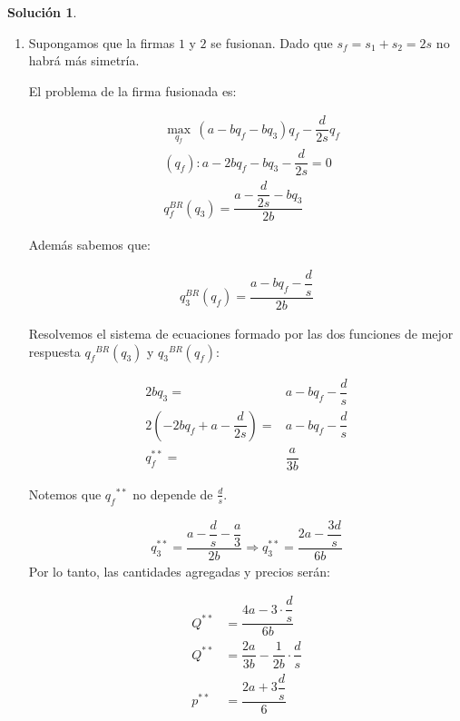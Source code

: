 \documentclass[a4paper, 11pt]{article}
\theoremstyle{definition}
\newtheorem{solucion}{Soluci\'on}
\begin{document}
\begin{solucion}
\begin{enumerate}
\begin{enumerate}
\item
Supongamos que la firmas $1$ y $2$ se fusionan. Dado que $s_f=s_1+s_2=2s$ no habrá más simetría.

El problema de la firma fusionada es:

\vspace*{-12pt}

\begin{align*}
 &\displaystyle\max_{q_f}\,(a-bq_f-bq_3)q_f-\dfrac{d}{2s}q_f \\
 &(q_f): a-2bq_f-bq_3-\dfrac{d}{2s}=0\\
& q_f^{BR}(q_3)=\dfrac{a-\dfrac{d}{2s}-bq_3}{2b}
\end{align*}

Además sabemos que:

\vspace*{-32pt}

\begin{align*}
q_3^{BR}(q_f)=\dfrac{a-bq_f-\dfrac{d}{s}}{2b}
\end{align*}

Resolvemos el sistema de ecuaciones formado por las dos funciones de mejor respuesta ${q_f}^{BR}(q_3)$ y ${q_3}^{BR}(q_f)$: 

\vspace*{-32pt}

\begin{align*}
2bq_3=&a-bq_f-\dfrac{d}{s}\\
2\left(-2bq_f+a-\dfrac{d}{2s}\right)=&a-bq_f-\dfrac{d}{s}\\
q_f^{**}=&\dfrac{a}{3b}
\end{align*}

Notemos que ${q_f}^{**}$ no depende de $\frac{d}{s}$.

\vspace*{-32pt}
\begin{align*}
q_3^{**}=\dfrac{a-\dfrac{d}{s}-\dfrac{a}{3}}{2b}\Rightarrow q_3^{**}=\dfrac{2a-\dfrac{3d}{s}}{6b}
 \end{align*}
Por lo tanto, las cantidades agregadas y precios serán:

\vspace*{-28pt}

\begin{align*}
Q^{**}&=\dfrac{4a-3\cdot \dfrac{d}{s}}{6b}\\
Q^{**}&=\dfrac{2a}{3b}-\dfrac{1}{2b}\cdot \dfrac{d}{s}\\
p^{**}&=\dfrac{2a+3\dfrac{d}{s}}{6}
\end{align*}


\end{enumerate}
\end{enumerate}
\end{solucion}
\end{document}
